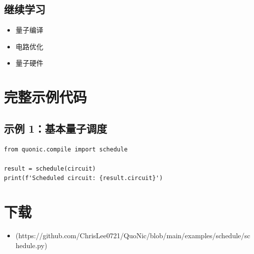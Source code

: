\documentclass[12pt,a4paper]{article}
\begin{document}
\subsection{继续学习}
\begin{itemize}
  \item 量子编译
  \item 电路优化
  \item 量子硬件
\end{itemize}

\section{完整示例代码}

\subsection{示例 1：基本量子调度}

\begin{verbatim}
from quonic.compile import schedule

result = schedule(circuit)
print(f'Scheduled circuit: {result.circuit}')
\end{verbatim}

\section{下载}

\begin{itemize}
  \item [schedule.py](https://github.com/ChrisLee0721/QuoNic/blob/main/examples/schedule/schedule.py)
\end{itemize}
\end{document}
